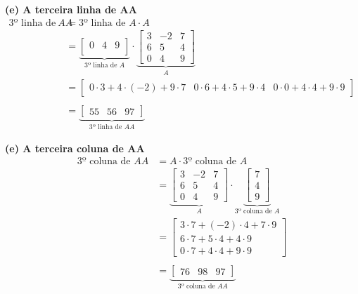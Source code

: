 \documentclass[a4paper,12pt]{article}
\begin{document}
\textbf{(e) A terceira linha de AA}
\begin{align*}
    \text{3º linha de }AA &= \text{3º linha de }A \cdot A \\
    &=
    \underbrace{
    \begin{bmatrix}
        0 & 4 & 9 \\
    \end{bmatrix}}_{\text{3º linha de }A}
    \cdot
    \underbrace{
    \begin{bmatrix}
        3 & -2 & 7 \\
        6 & 5 & 4 \\
        0 & 4 & 9
    \end{bmatrix}}_{A} \\
    &=
    \begin{bmatrix}
        0 \cdot 3 + 4 \cdot (-2) + 9 \cdot 7 &
        0 \cdot 6 + 4 \cdot   5  + 9 \cdot 4 &
        0 \cdot 0 + 4 \cdot   4  + 9 \cdot 9
    \end{bmatrix} \\ \\
    &=
    \underbrace{
    \begin{bmatrix}
        55 & 56 & 97
    \end{bmatrix}}_{\text{3º linha de }AA}
\end{align*}

\textbf{(e) A terceira coluna de AA}
\begin{align*}
    \text{3º coluna de }AA &= A \cdot \text{3º coluna de }A \\
    &=
    \underbrace{
    \begin{bmatrix}
        3 & -2 & 7 \\
        6 & 5 & 4 \\
        0 & 4 & 9
    \end{bmatrix}}_{A}
    \cdot
    \underbrace{
    \begin{bmatrix}
        7 \\
        4 \\
        9
    \end{bmatrix}}_{\text{3º coluna de }A} \\
    &=
    \begin{bmatrix}
        3 \cdot 7 + (-2) \cdot 4 + 7 \cdot 9 \\
        6 \cdot 7 +   5  \cdot 4 + 4 \cdot 9 \\
        0 \cdot 7 +   4  \cdot 4 + 9 \cdot 9
    \end{bmatrix} \\ \\
    &=
    \underbrace{
    \begin{bmatrix}
        76 & 98 & 97
    \end{bmatrix}}_{\text{3º coluna de }AA}
\end{align*}
\end{document}
